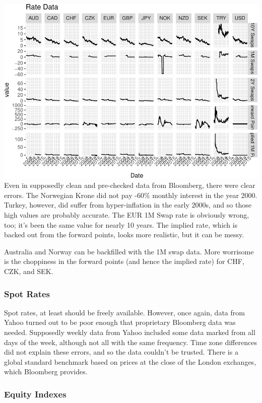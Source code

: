 \documentclass[]{article}
\begin{document}
\includegraphics{Econometric_FX_Forecasting_files/figure-latex/swaps_raw-1.pdf}
Even in supposedly clean and pre-checked data from Bloomberg, there were
clear errors. The Norwegian Krone did not pay -60\% monthly interest in
the year 2000. Turkey, however, did suffer from hyper-inflation in the
early 2000s, and so those high values are probably accurate. The EUR 1M
Swap rate is obviously wrong, too; it's been the same value for nearly
10 years. The implied rate, which is backed out from the forward points,
looks more realistic, but it can be messy.

Australia and Norway can be backfilled with the 1M swap data. More
worrisome is the choppiness in the forward points (and hence the implied
rate) for CHF, CZK, and SEK.

\subsubsection{Spot Rates}\label{spot-rates}

Spot rates, at least should be freely available. However, once again,
data from Yahoo turned out to be poor enough that proprietary Bloomberg
data was needed. Supposedly weekly data from Yahoo included some data
marked from all days of the week, although not all with the same
frequency. Time zone differences did not explain these errors, and so
the data couldn't be trusted. There is a global standard benchmark based
on prices at the close of the London exchanges, which Bloomberg
provides.

\subsubsection{Equity Indexes}\label{equity-indexes}
\end{document}
